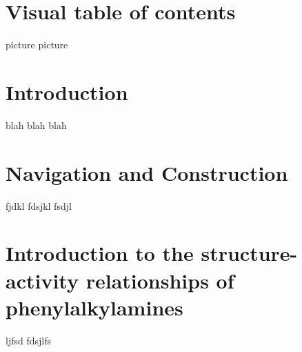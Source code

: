 \section{Visual table of contents}
picture
picture
\clearpage

\section{Introduction}
blah blah blah
\clearpage

\section{Navigation and Construction}
fjdkl
fdsjkl
fsdjl
\clearpage

\section{Introduction to the structure-activity relationships of phenylalkylamines}
ljfsd
fdsjlfs
